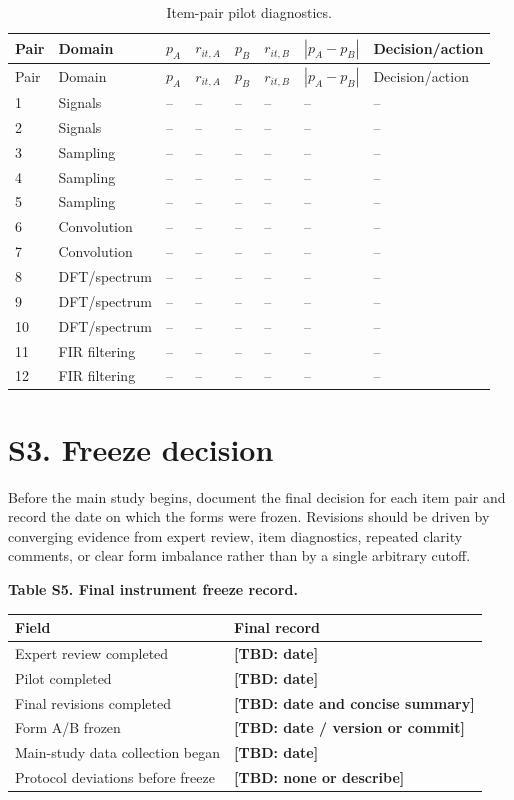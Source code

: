 \documentclass[10pt,a4paper]{article}
\newcommand{\tbd}[1]{\textbf{[TBD: #1]}}
\begin{document}
\begin{longtable}{C{0.07\textwidth} L{0.18\textwidth} C{0.09\textwidth} C{0.10\textwidth} C{0.09\textwidth} C{0.10\textwidth} C{0.10\textwidth} L{0.17\textwidth}}
\caption{Item-pair pilot diagnostics.}\label{tab:s2-item-pairs}\\
\toprule
Pair & Domain & $p_A$ & $r_{it,A}$ & $p_B$ & $r_{it,B}$ & $|p_A-p_B|$ & Decision/action \\
\midrule
\endfirsthead
\toprule
Pair & Domain & $p_A$ & $r_{it,A}$ & $p_B$ & $r_{it,B}$ & $|p_A-p_B|$ & Decision/action \\
\midrule
{} & Signals & -- & -- & -- & -- & -- & -- \\
2 & Signals & -- & -- & -- & -- & -- & -- \\
3 & Sampling & -- & -- & -- & -- & -- & -- \\
4 & Sampling & -- & -- & -- & -- & -- & -- \\
5 & Sampling & -- & -- & -- & -- & -- & -- \\
6 & Convolution & -- & -- & -- & -- & -- & -- \\
7 & Convolution & -- & -- & -- & -- & -- & -- \\
8 & DFT/spectrum & -- & -- & -- & -- & -- & -- \\
9 & DFT/spectrum & -- & -- & -- & -- & -- & -- \\
10 & DFT/spectrum & -- & -- & -- & -- & -- & -- \\
11 & FIR filtering & -- & -- & -- & -- & -- & -- \\
12 & FIR filtering & -- & -- & -- & -- & -- & -- \\
\bottomrule
\end{longtable}

\section*{S3. Freeze decision}
Before the main study begins, document the final decision for each item pair and record the date on which the forms were frozen. Revisions should be driven by converging evidence from expert review, item diagnostics, repeated clarity comments, or clear form imbalance rather than by a single arbitrary cutoff.

\begin{center}
\textbf{Table S5. Final instrument freeze record.}\\[4pt]
\begin{tabular}{L{0.43\textwidth} L{0.47\textwidth}}
\toprule
Field & Final record \\
\midrule
Expert review completed & \tbd{date} \\
Pilot completed & \tbd{date} \\
Final revisions completed & \tbd{date and concise summary} \\
Form A/B frozen & \tbd{date / version or commit} \\
Main-study data collection began & \tbd{date} \\
Protocol deviations before freeze & \tbd{none or describe} \\
\bottomrule
\end{tabular}
\end{center}
\end{document}
